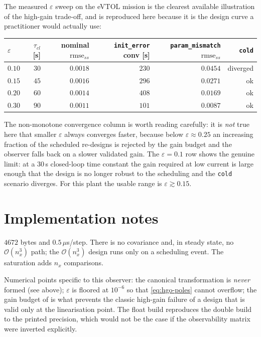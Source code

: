 The measured $\varepsilon$ sweep on the eVTOL mission is the clearest available illustration of
the high-gain trade-off, and is reproduced here because it is the design curve a practitioner
would actually use:
\begin{center}
\begin{tabular}{@{}lrrrrr@{}}
\toprule
$\varepsilon$ & $\tau_{cl}$ [s] & nominal $\mathrm{rmse}_{ss}$ & \texttt{init\_error} conv [s]
 & \texttt{param\_mismatch} $\mathrm{rmse}_{ss}$ & \texttt{cold} \\
\midrule
$0.10$ & $30$ & $0.0018$ & $230$ & $0.0454$ & diverged \\
$0.15$ & $45$ & $0.0016$ & $296$ & $0.0271$ & ok \\
$0.20$ & $60$ & $0.0014$ & $408$ & $0.0169$ & ok \\
$0.30$ & $90$ & $0.0011$ & $101$ & $0.0087$ & ok \\
\bottomrule
\end{tabular}
\end{center}
The non-monotone convergence column is worth reading carefully: it is \emph{not} true here that
smaller $\varepsilon$ always converges faster, because below $\varepsilon\approx0.25$ an
increasing fraction of the scheduled re-designs is rejected by the gain budget and the observer
falls back on a slower validated gain.  The $\varepsilon=0.1$ row shows the genuine limit: at a
$30$\,s closed-loop time constant the gain required at low current is large enough that the
design is no longer robust to the scheduling and the \texttt{cold} scenario diverges.  For this
plant the usable range is $\varepsilon\gtrsim0.15$.

\section{Implementation notes}
$4672$ bytes and $0.5\,\mu$s/step.  There is no
covariance and, in steady state, no $\mathcal{O}(n_x^3)$ path; the $\mathcal{O}(n_x^3)$ design
runs only on a scheduling event.  The saturation adds $n_x$ comparisons.

Numerical points specific to this observer: the canonical transformation is \emph{never} formed
(see above); $\varepsilon$ is floored at $10^{-6}$ so that \eqref{eq:hgo-poles} cannot overflow;
the gain budget of  is what prevents the classic high-gain failure of a
design that is valid only at the linearisation point.  The float build reproduces the double
build to the printed precision, which would not be the case if the observability matrix were
inverted explicitly.

